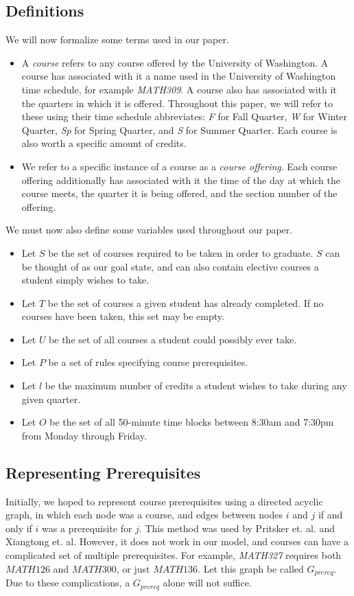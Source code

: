 \documentclass[11pt]{article} %
\begin{document}
\subsection{Definitions} We will now formalize some terms used in our paper.
\begin{itemize} \item A {\it course} refers to any course offered by the
University of Washington. A course has associated with it a name used in the
University of Washington time schedule, for example {\it MATH309}. A course also
has associated with it the quarters in which it is offered. Throughout this
paper, we will refer to these using their time schedule abbreviates: {\it F} for
Fall Quarter, {\it W} for Winter Quarter, {\it Sp} for Spring Quarter, and {\it
S} for Summer Quarter. Each course is also worth a specific amount of credits.
\item We refer to a specific instance of a course as a {\it course offering}.
Each course offering additionally has associated with it the time of the day at
which the course meets, the quarter it is being offered, and the section number
of the offering.  \end{itemize}

We must now also define some variables used throughout our paper.
\begin{itemize} \item Let $S$ be the set of courses required to be taken in
order to graduate. $S$ can be thought of as our goal state, and can also contain
elective courses a student simply wishes to take.  \item Let $T$ be the set of
courses a given student has already completed. If no courses have been taken,
this set may be empty.  \item Let $U$ be the set of all courses a student could
possibly ever take.  \item Let $P$ be a set of rules specifying course
prerequisites.  \item Let $l$ be the maximum number of credits a student wishes
to take during any given quarter.  \item Let $O$ be the set of all 50-minute
time blocks between 8:30am and 7:30pm from Monday through Friday.  \end{itemize}

\subsection{Representing Prerequisites} Initially, we hoped to represent course
prerequisites using a directed acyclic graph, in which each node was a course,
and edges between nodes $i$ and $j$ if and only if $i$ was a prerequisite for
$j$.  This method was used by Pritsker et. al. and Xiangtong et. al. However, it
does not work in our model, and courses can have a complicated set of multiple
prerequisites. For example, {\it MATH327} requires both $MATH126$ and $MATH300$,
or just $MATH136$. Let this graph be called $G_{prereq}$. Due to these
complications, a $G_{prereq}$ alone will not suffice.
\end{document}
